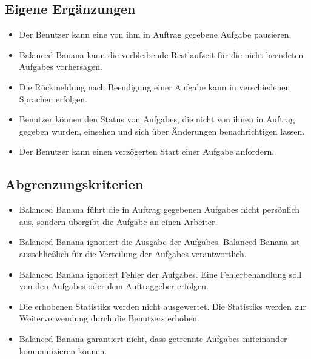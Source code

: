 \documentclass[a4paper,12pt]{article}
\begin{document}
\subsection{Eigene Ergänzungen}
\begin{itemize}[nosep]

	\item Der \gls{Benutzer} kann eine von ihm in Auftrag gegebene \gls{Aufgabe} pausieren.	
	
	\item Balanced Banana kann die verbleibende Restlaufzeit für die nicht beendeten \glspl{Aufgabe} vorhersagen.
	
	\item Die Rückmeldung nach Beendigung einer \gls{Aufgabe} kann in verschiedenen Sprachen erfolgen.
	
	\item \gls{Benutzer} können den Status von \glspl{Aufgabe}, die nicht von ihnen in Auftrag gegeben wurden, einsehen und 	sich über Änderungen benachrichtigen lassen.
	
	\item Der \gls{Benutzer} kann einen verzögerten Start einer \gls{Aufgabe} anfordern.
	
\end{itemize}

\subsection{Abgrenzungskriterien}
\begin{itemize}[nosep]

	\item Balanced Banana führt die in Auftrag gegebenen \glspl{Aufgabe} nicht persönlich aus, sondern übergibt die \gls{Aufgabe} an einen \gls{Arbeiter}.
	
	\item Balanced Banana ignoriert die Ausgabe der \glspl{Aufgabe}. Balanced Banana ist ausschließlich für die Verteilung der \glspl{Aufgabe} verantwortlich.

	\item Balanced Banana ignoriert Fehler der \glspl{Aufgabe}. Eine \gls{Fehlerbehandlung} soll von den \glspl{Aufgabe} oder dem Auftraggeber erfolgen.

	\item Die erhobenen \glspl{Statistik} werden nicht ausgewertet. Die \glspl{Statistik} werden zur Weiterverwendung durch die \glspl{Benutzer} erhoben.
	
	\item Balanced Banana garantiert nicht, dass getrennte \glspl{Aufgabe} miteinander kommunizieren können.
	
\end{itemize}
\end{document}
